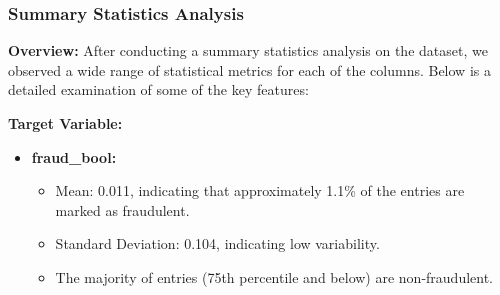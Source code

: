 \documentclass[12pt,a4paper]{report}
\begin{document}
\clearpage

\subsubsection{Summary Statistics Analysis}

\textbf{Overview:}
After conducting a summary statistics analysis on the dataset, we observed a wide range of statistical metrics for each of the columns. Below is a detailed examination of some of the key features:

\textbf{Target Variable:}
\begin{itemize}
    \item \textbf{fraud\_bool:}
        \begin{itemize}
            \item Mean: 0.011, indicating that approximately 1.1\% of the entries are marked as fraudulent.
            \item Standard Deviation: 0.104, indicating low variability.
            \item The majority of entries (75th percentile and below) are non-fraudulent.
        \end{itemize}
\end{itemize}
\end{document}
